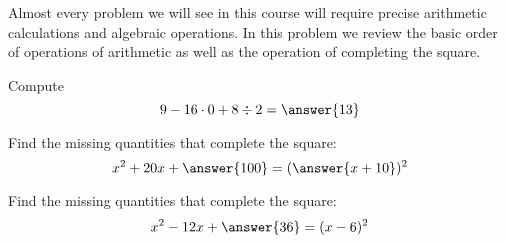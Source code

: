 \documentclass{ximera}
\author{}
\begin{document}
\begin{exercise}

Almost every problem we will see in this course will require precise arithmetic calculations and algebraic operations. In this problem we review the basic order of operations of arithmetic as well as the operation of completing the square.

\begin{problem}
  Compute
  \[
  9-16\cdot 0 + 8\div 2 = \answer{13}
  \]
\end{problem}


\begin{problem}
  Find the missing quantities that complete the square:
  \[
   x^2 + 20x +\answer{100} = (\answer{x+10})^2 
   \]
\end{problem}


\begin{problem}
  Find the missing quantities that complete the square:
  \[
  x^2-12x + \answer{36} = (x-6)^2
  \]
\end{problem}


\end{exercise}
\end{document}
